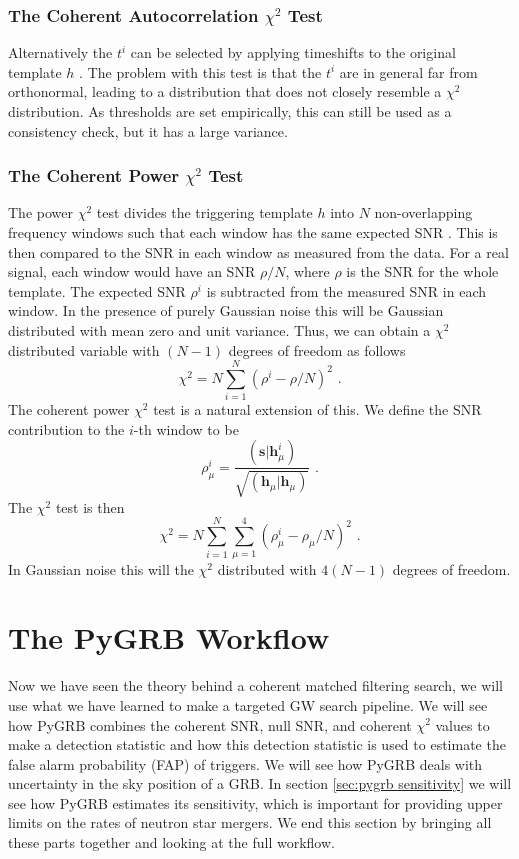 \documentclass[11pt]{cuthesis}
\newcommand{\fs}{\text{ .}}
\begin{document}
\subsubsection{The Coherent Autocorrelation $\chi^2$ Test}
Alternatively the $t^i$ can be selected by applying timeshifts to the original template $h$ \cite{hanna-thesis}. The problem with this test is that the $t^i$ are in general far from orthonormal, leading to a distribution that does not closely resemble a $\chi^2$ distribution. As thresholds are set empirically, this can still be used as a consistency check, but it has a large variance.


\subsubsection{The Coherent Power $\chi^2$ Test}
The power $\chi^2$ test divides the triggering template $h$ into $N$ non-overlapping frequency windows such that each window has the same expected SNR \cite{allen_chisq}. This is then compared to the SNR in each window as measured from the data. For a real signal, each window would have an SNR $\rho/N$, where $\rho$ is the SNR for the whole template. The expected SNR $\rho^i$ is subtracted from the measured SNR in each window. In the presence of purely Gaussian noise this will be Gaussian distributed with mean zero and unit variance. Thus, we can obtain a $\chi^2$ distributed variable with $(N-1)$ degrees of freedom as follows
\begin{equation}
\chi^2 = N \sum_{i=1}^N (\rho^i - \rho/N)^2 \fs
\end{equation}
The coherent power $\chi^2$ test is a natural extension of this. We define the SNR contribution to the $i$-th window to be
\begin{equation}
\rho^i_\mu = \frac{(\textbf{s}|\textbf{h}^i_\mu)}{\sqrt{(\textbf{h}_\mu|\textbf{h}_\mu)}} \fs
\end{equation}
The $\chi^2$ test is then
\begin{equation}
\chi^2 = N \sum_{i=1}^N \sum_{\mu=1}^4 (\rho^i_\mu - \rho_\mu/N)^2 \fs
\end{equation}
In Gaussian noise this will the $\chi^2$ distributed with $4(N-1)$ degrees of freedom. 

\section{The PyGRB Workflow} \label{sec:pygrb workflow}
Now we have seen the theory behind a coherent matched filtering search, we will use what we have learned to make a targeted GW search pipeline. We will see how PyGRB combines the coherent SNR, null SNR, and coherent $\chi^2$ values to make a detection statistic and how this detection statistic is used to estimate the false alarm probability (FAP) of triggers. We will see how PyGRB deals with uncertainty in the sky position of a GRB. In section \ref{sec:pygrb sensitivity} we will see how PyGRB estimates its sensitivity, which is important for providing upper limits on the rates of neutron star mergers. We end this section by bringing all these parts together and looking at the full workflow.
\end{document}
